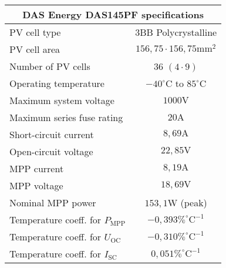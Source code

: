 \footnotesize
\begin{tabular}{|l|c|}
	\hline
	\multicolumn{2}{|c|}{\textbf{DAS Energy DAS145PF specifications}} \\
	\hline
	PV cell type & 3BB Polycrystalline \\
	PV cell area & $156,75 \cdot 156,75\mathrm{mm}^2$ \\
	Number of PV cells & $36$ $(4 \cdot 9)$ \\
	Operating temperature & $-40^\circ \mathrm{C}$ to $85^\circ \mathrm{C}$ \\
	\hline
 	Maximum system voltage & $1000\mathrm{V}$ \\
	Maximum series fuse rating & $20\mathrm{A}$ \\
	Short-circuit current & $8,69\mathrm{A}$ \\
	Open-circuit voltage & $22,85\mathrm{V}$ \\
	MPP current & $8,19\mathrm{A}$ \\
	MPP voltage & $18,69\mathrm{V}$ \\
	Nominal MPP power & $153,1\mathrm{W}$ (peak) \\
	\hline
	Temperature coeff. for $P_{\mathrm{MPP}}$ & $-0,393 \%^\circ \mathrm{C}^{-1}$ \\
	Temperature coeff. for $U_{\mathrm{OC}}$ & $-0,310 \%^\circ \mathrm{C}^{-1}$ \\
	Temperature coeff. for $I_{\mathrm{SC}}$ & $0,051 \%^\circ \mathrm{C}^{-1}$ \\
	\hline
\end{tabular}